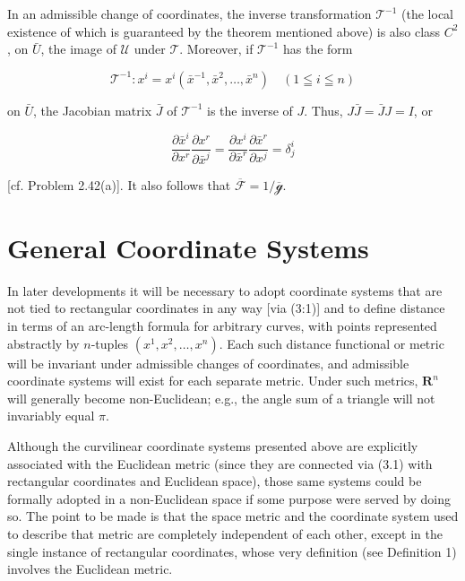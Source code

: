 \documentclass[10pt]{article}
\begin{document}
In an admissible change of coordinates, the inverse transformation $\mathscr{T}^{-1}$ (the local existence of which is guaranteed by the theorem mentioned above) is also class $C^{2}$, on $\bar{U}$, the image of $\mathscr{U}$ under $\mathscr{T}$. Moreover, if $\mathscr{T}^{-1}$ has the form


\begin{equation*}
\mathscr{T}^{-1}: x^{i}=x^{i}\left(\bar{x}^{-1}, \bar{x}^{2}, \ldots, \bar{x}^{n}\right) \quad(1 \leqq i \leqq n) \tag{3.6}
\end{equation*}


on $\bar{U}$, the Jacobian matrix $\bar{J}$ of $\mathscr{T}^{-1}$ is the inverse of $J$. Thus, $J \bar{J}=\bar{J} J=I$, or


\begin{equation*}
\frac{\partial \bar{x}^{i}}{\partial x^{r}} \frac{\partial x^{r}}{\partial \bar{x}^{j}}=\frac{\partial x^{i}}{\partial \bar{x}^{r}} \frac{\partial \bar{x}^{r}}{\partial x^{j}}=\delta_{j}^{i} \tag{3.7}
\end{equation*}


[cf. Problem 2.42(a)]. It also follows that $\overline{\mathscr{F}}=1 / \overline{\mathscr{g}}$.

\section*{General Coordinate Systems}
In later developments it will be necessary to adopt coordinate systems that are not tied to rectangular coordinates in any way [via (3:1)] and to define distance in terms of an arc-length formula for arbitrary curves, with points represented abstractly by $n$-tuples $\left(x^{1}, x^{2}, \ldots, x^{n}\right)$. Each such distance functional or metric will be invariant under admissible changes of coordinates, and admissible coordinate systems will exist for each separate metric. Under such metrics, $\mathbf{R}^{n}$ will generally become non-Euclidean; e.g., the angle sum of a triangle will not invariably equal $\pi$.

Although the curvilinear coordinate systems presented above are explicitly associated with the Euclidean metric (since they are connected via (3.1) with rectangular coordinates and Euclidean space), those same systems could be formally adopted in a non-Euclidean space if some purpose were served by doing so. The point to be made is that the space metric and the coordinate system used to describe that metric are completely independent of each other, except in the single instance of rectangular coordinates, whose very definition (see Definition 1) involves the Euclidean metric.
\end{document}
